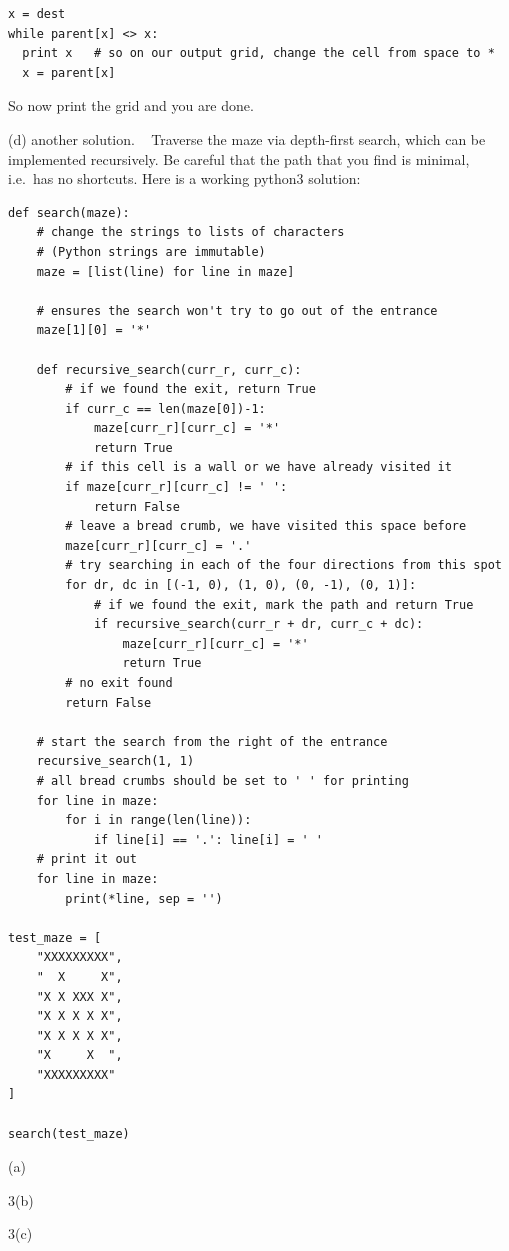 \documentclass[12pt]{article}
\begin{document}
\begin{verbatim}
x = dest
while parent[x] <> x:
  print x   # so on our output grid, change the cell from space to *
  x = parent[x]
\end{verbatim}

So now print the grid and you are done.

(d) another solution. ~
Traverse the maze via depth-first search,
which can be implemented recursively. Be careful that the path
that you find is minimal, i.e.\ has no shortcuts.
Here is a working python3 solution:

{\footnotesize\begin{verbatim}
def search(maze):
    # change the strings to lists of characters
    # (Python strings are immutable)
    maze = [list(line) for line in maze]

    # ensures the search won't try to go out of the entrance
    maze[1][0] = '*'

    def recursive_search(curr_r, curr_c):
        # if we found the exit, return True
        if curr_c == len(maze[0])-1:
            maze[curr_r][curr_c] = '*'
            return True
        # if this cell is a wall or we have already visited it
        if maze[curr_r][curr_c] != ' ':
            return False
        # leave a bread crumb, we have visited this space before
        maze[curr_r][curr_c] = '.'
        # try searching in each of the four directions from this spot
        for dr, dc in [(-1, 0), (1, 0), (0, -1), (0, 1)]:
            # if we found the exit, mark the path and return True
            if recursive_search(curr_r + dr, curr_c + dc):
                maze[curr_r][curr_c] = '*'
                return True
        # no exit found
        return False

    # start the search from the right of the entrance
    recursive_search(1, 1)
    # all bread crumbs should be set to ' ' for printing
    for line in maze:
        for i in range(len(line)):
            if line[i] == '.': line[i] = ' '
    # print it out
    for line in maze:
        print(*line, sep = '')

test_maze = [
    "XXXXXXXXX",
    "  X     X",
    "X X XXX X",
    "X X X X X",
    "X X X X X",
    "X     X  ",
    "XXXXXXXXX"
]

search(test_maze)
\end{verbatim}}
(a)
\vfill

3(b)
\vfill

3(c)
\vfill~
\end{document}
